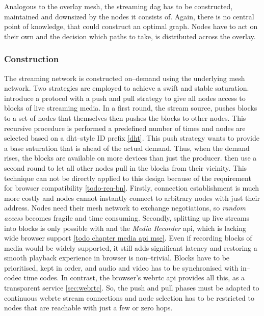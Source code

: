 Analogous to the overlay mesh, the streaming \gls{dag} has to be constructed, maintained and downsized by the nodes it consists of. Again, there is no central point of knowledge, that could construct an optimal graph. Nodes have to act on their own and the decision which paths to take, is distributed across the overlay.

\subsubsection{Construction}
The streaming network is constructed on–demand using the underlying mesh network. Two strategies are employed to achieve a swift and stable saturation.
\citet*[\S3]{push-to-pull} introduce a protocol with a push and pull strategy to give all nodes access to blocks of live streaming media. In a first round, the stream source, pushes blocks to a set of nodes that themselves then pushes the blocks to other nodes. This recursive procedure is performed a predefined number of times and nodes are selected based on a \gls{dht}–style ID prefix \ref{dht}. This push strategy wants to provide a base saturation that is ahead of the actual demand. Thus, when the demand rises, the blocks are available on more devices than just the producer. \citet{push-to-pull} then use a second round to let all other nodes pull in the blocks from their vicinity. This technique can not be directly applied to this design because of the requirement for browser compatibility \ref{todo-req-bn}. Firstly, connection establishment is much more costly and nodes cannot instantly connect to arbitrary nodes with just their address. Nodes need their mesh network to exchange negotiations, so \textit{random access} becomes fragile and time consuming.
Secondly, splitting up live streams into blocks is only possible with  and the \textit{Media Recorder} \gls{api}, which is lacking wide browser support \ref{todo chapter media api mse}. Even if recording blocks of media would be widely supported, it still adds significant latency and restoring a smooth playback experience in browser is non–trivial. Blocks have to be prioritised, kept in order, and audio and video has to be synchronised with in–codec time codes.
In contrast, the browser's \gls{webrtc} \gls{api} provides all this, as a transparent service \ref{sec:webrtc}.
So, the push and pull phases must be adapted to continuous \gls{webrtc} stream connections and node selection has to be restricted to nodes that are reachable with just a few or zero hops.

